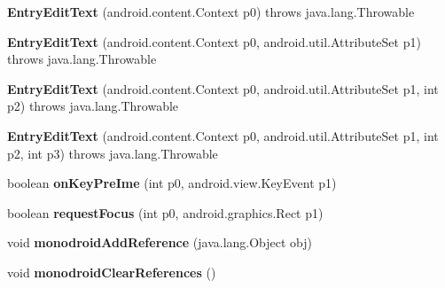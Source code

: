 \begin{DoxyCompactItemize}
\item 
\mbox{\label{classmd5b60ffeb829f638581ab2bb9b1a7f4f3f_1_1_entry_edit_text_a43fa3f79c97f30676559ff6ab8a5773d}} 
{\bfseries Entry\+Edit\+Text} (android.\+content.\+Context p0)  throws java.\+lang.\+Throwable 	
\item 
\mbox{\label{classmd5b60ffeb829f638581ab2bb9b1a7f4f3f_1_1_entry_edit_text_a2ed76d0883a4b11b021ecdb18a945f8f}} 
{\bfseries Entry\+Edit\+Text} (android.\+content.\+Context p0, android.\+util.\+Attribute\+Set p1)  throws java.\+lang.\+Throwable 	
\item 
\mbox{\label{classmd5b60ffeb829f638581ab2bb9b1a7f4f3f_1_1_entry_edit_text_a0a1ed18804c51763e823cb1b17d9a256}} 
{\bfseries Entry\+Edit\+Text} (android.\+content.\+Context p0, android.\+util.\+Attribute\+Set p1, int p2)  throws java.\+lang.\+Throwable 	
\item 
\mbox{\label{classmd5b60ffeb829f638581ab2bb9b1a7f4f3f_1_1_entry_edit_text_a51d0a64d0a474ed8aabfefc92289d233}} 
{\bfseries Entry\+Edit\+Text} (android.\+content.\+Context p0, android.\+util.\+Attribute\+Set p1, int p2, int p3)  throws java.\+lang.\+Throwable 	
\item 
\mbox{\label{classmd5b60ffeb829f638581ab2bb9b1a7f4f3f_1_1_entry_edit_text_ad7423e65912144f49fe51c2bc17a6c14}} 
boolean {\bfseries on\+Key\+Pre\+Ime} (int p0, android.\+view.\+Key\+Event p1)
\item 
\mbox{\label{classmd5b60ffeb829f638581ab2bb9b1a7f4f3f_1_1_entry_edit_text_a016f20143c082aa9a41ff9d35301f72a}} 
boolean {\bfseries request\+Focus} (int p0, android.\+graphics.\+Rect p1)
\item 
\mbox{\label{classmd5b60ffeb829f638581ab2bb9b1a7f4f3f_1_1_entry_edit_text_a7472d6c3ce83f5d2334598037d779849}} 
void {\bfseries monodroid\+Add\+Reference} (java.\+lang.\+Object obj)
\item 
\mbox{\label{classmd5b60ffeb829f638581ab2bb9b1a7f4f3f_1_1_entry_edit_text_a788af3e6d9362437aec111b13b19f2c3}} 
void {\bfseries monodroid\+Clear\+References} ()
\end{DoxyCompactItemize}
